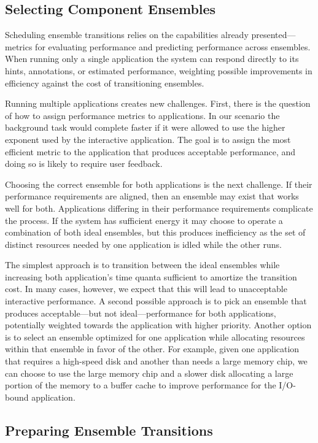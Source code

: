 \subsection{Selecting Component Ensembles}
\label{subsec-select}

Scheduling ensemble transitions relies on the capabilities already
presented---metrics for evaluating performance and predicting performance
across ensembles. When running only a single application the system can
respond directly to its hints, annotations, or estimated performance,
weighting possible improvements in efficiency against the cost of
transitioning ensembles.

Running multiple applications creates new challenges. First, there is the
question of how to assign performance metrics to applications. In our
scenario the background task would complete faster if it were allowed to use
the higher exponent used by the interactive application. The goal is to
assign the most efficient metric to the application that produces acceptable
performance, and doing so is likely to require user feedback.

Choosing the correct ensemble for both applications is the next challenge. If
their performance requirements are aligned, then an ensemble may exist that
works well for both. Applications differing in their performance requirements
complicate the process. If the system has sufficient energy it may choose to
operate a combination of both ideal ensembles, but this produces inefficiency
as the set of distinct resources needed by one application is idled while the
other runs.

The simplest approach is to transition between the ideal ensembles while
increasing both application's time quanta sufficient to amortize the
transition cost. In many cases, however, we expect that this will lead to
unacceptable interactive performance. A second possible approach is to pick
an ensemble that produces acceptable---but not ideal---performance for both
applications, potentially weighted towards the application with higher
priority. Another option is to select an ensemble optimized for one
application while allocating resources within that ensemble in favor of the
other. For example, given one application that requires a high-speed disk and
another than needs a large memory chip, we can choose to use the large memory
chip and a slower disk allocating a large portion of the memory to a buffer
cache to improve performance for the I/O-bound application.

\subsection{Preparing Ensemble Transitions}
\label{subsec-prepare}

